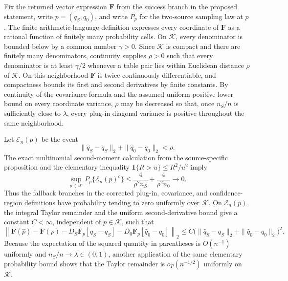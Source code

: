 Fix the returned vector expression \(\mathbf F\) from the success branch in the proposed statement, write \(p=(q_S,q_0)\), and write \(P_p\) for the two-source sampling law at \(p\).  The finite arithmetic-language definition expresses every coordinate of \(\mathbf F\) as a rational function of finitely many probability cells.  On \(\mathcal K\), every denominator is bounded below by a common number \(\gamma>0\).  Since \(\mathcal K\) is compact and there are finitely many denominators, continuity supplies \(\rho>0\) such that every denominator is at least \(\gamma/2\) whenever a table pair lies within Euclidean distance \(\rho\) of \(\mathcal K\).  On this neighborhood \(\mathbf F\) is twice continuously differentiable, and compactness bounds its first and second derivatives by finite constants.  By continuity of the covariance formula and the assumed uniform positive lower bound on every coordinate variance, \(\rho\) may be decreased so that, once \(n_S/n\) is sufficiently close to \(\lambda\), every plug-in diagonal variance is positive throughout the same neighborhood.

Let \(\mathcal E_n(p)\) be the event
\[
\|\widehat q_S-q_S\|_2+\|\widehat q_0-q_0\|_2<\rho.
\]
The exact multinomial second-moment calculation from the source-specific proposition and the elementary inequality \(\mathbf 1\{R>u\}\le R^2/u^2\) imply
\[
\sup_{p\in\mathcal K}P_p\{\mathcal E_n(p)^c\}
\le \frac{4}{\rho^2n_S}+\frac{4}{\rho^2n_0}
\longrightarrow0.
\]
Thus the fallback branches in the corrected plug-in, covariance, and confidence-region definitions have probability tending to zero uniformly over \(\mathcal K\).  On \(\mathcal E_n(p)\), the integral Taylor remainder and the uniform second-derivative bound give a constant \(C<\infty\), independent of \(p\in\mathcal K\), such that
\[
\left\|\mathbf F(\widehat p)-\mathbf F(p)
-D_S\mathbf F_p[\widehat q_S-q_S]
-D_0\mathbf F_p[\widehat q_0-q_0]\right\|_2
\le C\bigl(\|\widehat q_S-q_S\|_2+\|\widehat q_0-q_0\|_2\bigr)^2.
\]
Because the expectation of the squared quantity in parentheses is \(O(n^{-1})\) uniformly and \(n_S/n\to\lambda\in(0,1)\), another application of the same elementary probability bound shows that the Taylor remainder is \(o_P(n^{-1/2})\) uniformly on \(\mathcal K\).

